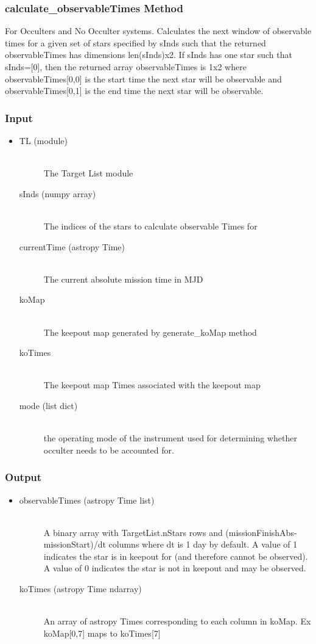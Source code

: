 \documentclass[cleanfoot]{asme2ej}
\begin{document}
\subsubsection{calculate\_observableTimes Method}
For Occulters and No Occulter systems. Calculates the next window of observable times for a given set of stars specified by sInds such that the returned observableTimes has dimensions len(sInds)x2. If sInds has one star such that sInds=[0], then the returned array observableTimes is 1x2 where observableTimes[0,0] is the start time the next star will be observable and observableTimes[0,1] is the end time the next star will be observable.
\subsubsection*{Input}
\begin{itemize}
\item 
\begin{description}
    \item[TL (module)] \hfill \\ The Target List module
    \item[sInds (numpy array)] \hfill \\ The indices of the stars to calculate observable Times for
    \item[currentTime (astropy Time)] \hfill \\ The current absolute mission time in MJD
    \item[koMap] \hfill \\ The keepout map generated by generate\_koMap method
    \item[koTimes] \hfill \\ The keepout map Times associated with the keepout map
    \item[mode (list dict)] \hfill \\ the operating mode of the instrument used for determining whether occulter needs to be accounted for.
\end{description}
\end{itemize}
\subsubsection*{Output}
\begin{itemize}
\item 
\begin{description}
    \item[observableTimes (astropy Time list)] \hfill \\ A binary array with TargetList.nStars rows and (missionFinishAbs-missionStart)/dt columns where dt is 1 day by default. A value of 1 indicates the star is in keepout for (and therefore cannot be observed). A value of 0 indicates the star is not in keepout and may be observed.
    \item[koTimes (astropy Time ndarray)] \hfill \\ An array of astropy Times corresponding to each column in koMap. Ex koMap[0,7] maps to koTimes[7] 
\end{description}
\end{itemize}
\end{document}

